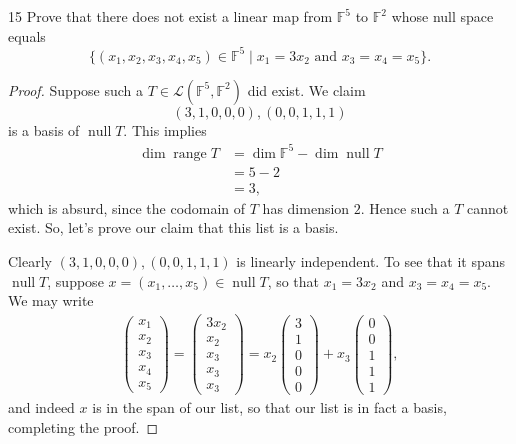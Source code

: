 \documentclass{extarticle}
\newenvironment{problem}[1]{\begin{prob*}{#1}{}}{\end{prob*}}
\newcommand{\F}{\mathbb{F}}
\newcommand{\Hom}{\mathcal{L}}
\DeclareMathOperator{\Null}{null}
\DeclareMathOperator{\Range}{range}
\begin{document}
\begin{problem}{15}
Prove that there does not exist a linear map from $\F^5$ to $\F^2$ whose null space equals
\begin{equation*}
\{(x_1,x_2,x_3,x_4,x_5)\in\F^5\mid x_1=3x_2 \text{ and }x_3 = x_4 = x_5\}.
\end{equation*}
\end{problem}
\begin{proof}
Suppose such a $T\in\Hom(\F^5, \F^2)$ did exist.  We claim 
\begin{equation*}
(3, 1, 0, 0, 0), (0, 0, 1, 1, 1)
\end{equation*}
is a basis of $\Null T$.  This implies
\begin{align*}
\dim \Range T &= \dim\F^5 - \dim \Null T\\
&= 5 - 2\\
&= 3,
\end{align*}
which is absurd, since the codomain of $T$ has dimension $2$.  Hence such a $T$ cannot exist.  So, let's prove our claim that this list is a basis.
\par Clearly $(3, 1, 0, 0, 0), (0, 0, 1, 1, 1)$ is linearly independent.  To see that it spans $\Null T$, suppose $x=(x_1,\dots,x_5)\in\Null T$, so that $x_1=3x_2$ and $x_3 = x_4 = x_5$.  We may write
\begin{align*}
\begin{pmatrix}x_1\\x_2\\x_3\\x_4\\x_5 \end{pmatrix} = \begin{pmatrix}3x_2\\x_2\\x_3\\x_3\\x_3 \end{pmatrix} = x_2\begin{pmatrix}3\\1\\0\\0\\0\end{pmatrix}  + x_3\begin{pmatrix}0\\0\\1\\1\\1\end{pmatrix},
\end{align*}
and indeed $x$ is in the span of our list, so that our list is in fact a basis, completing the proof.
\end{proof}
\end{document}
